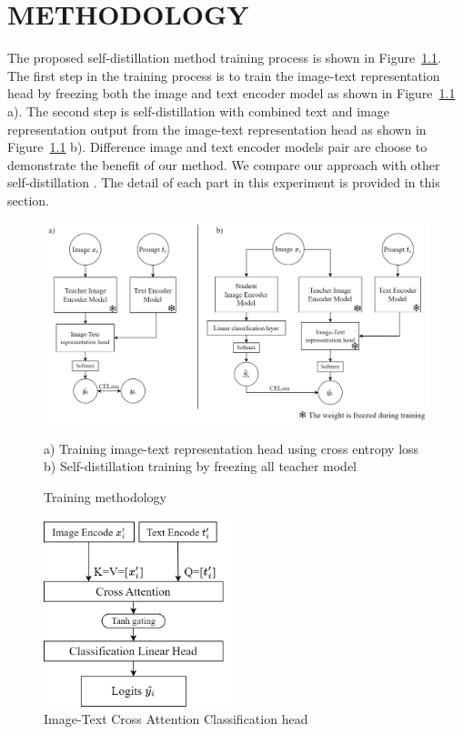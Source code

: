 \chapter{METHODOLOGY}

The proposed self-distillation method training process is shown in Figure~\ref{fig:methodology}.
The first step in the training process is to train the image-text representation head by freezing both the image and text encoder model as shown in Figure~\ref{fig:methodology} a).
The second step is self-distillation with combined text and image representation output from the image-text representation head as shown in Figure~\ref{fig:methodology} b).
Difference image and text encoder models pair are choose to demonstrate the benefit of our method.
We compare our approach with other self-distillation .
The detail of each part in this experiment is provided in this section.

\begin{figure}[h]
    \caption{Training methodology}
    \label{fig:methodology}
    \begin{center}
        \includegraphics[width=1\textwidth]{Images/Methodology.png}
    \end{center}
    \small a) Training image-text representation head using cross entropy loss b) Self-distillation training by freezing all teacher model
\end{figure}

\begin{figure}[h]
    \caption{Image-Text Cross Attention Classification head}
    \label{fig:cross_attention}
    \centering
    \includegraphics[width=0.5\textwidth]{Images/CrossAttention.png}
\end{figure}

